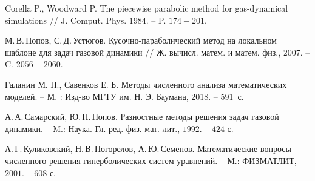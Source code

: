 \documentclass[12pt,a4paper]{article}
\begin{document}
    \newpage

    \begin{thebibliography}{9}
  
         Corella P., Woodward P. The piecewise parabolic method for gas-dynamical simulations // J. Comput. Phys. $1984$. -- P. $174-201$.
  
         М.\,В.\,Попов, С.\,Д.\,Устюгов. Кусочно-параболический метод на локальном шаблоне для задач газовой динамики // Ж. вычисл. матем. и матем. физ., $2007$. -- C. $2056-2060$.
  
         Галанин М. П., Савенков Е. Б. Методы численного анализа математических моделей. -- М. : Изд-во МГТУ им. Н. Э. Баумана, 2018. -- 591~с.

         А.\,А.\,Самарский, Ю.\,П.\,Попов. Разностные методы решения задач газовой динамики. -- M.: Наука. Гл. ред. физ. мат. лит., $1992$. -- $424$ с.

         А.\,Г.\,Куликовский, Н.\,В.\,Погорелов, А.\,Ю.\,Семенов. Математические вопросы численного решения гиперболических систем уравнений. -- М.: ФИЗМАТЛИТ, $2001$. -- $608$ с.
  
    \end{thebibliography}
\end{document}
